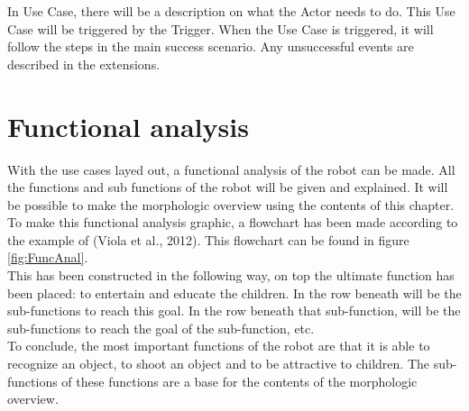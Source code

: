 \documentclass[11pt,twoside,a4paper]{report}
\begin{document}
\begin{usecase}
\end{usecase}
In Use Case, there will be a description on what the Actor needs to do. This Use Case will be triggered by the Trigger. When the Use Case is triggered, it will follow the steps in the main success scenario. Any unsuccessful events are described in the extensions. 


\chapter{Functional analysis}
With the use cases layed out, a functional analysis of the robot can be made. All the functions and sub functions of the robot will be given and explained. It will be possible to make the morphologic overview using the contents of this chapter. \\
To make this functional analysis graphic, a flowchart has been made according to the example of (Viola et al., 2012). This flowchart can be found in figure \ref{fig:FuncAnal}.\\
This has been constructed in the following way, on top the ultimate function has been placed: to entertain and educate the children. In the row beneath will be the sub-functions to reach this goal. In the row beneath that sub-function, will be the sub-functions to reach the goal of the sub-function, etc. \\
To conclude, the most important functions of the robot are that it is able to recognize an object, to shoot an object and to be attractive to children. The sub-functions of these functions are a base for the contents of the morphologic overview. 
\end{document}
